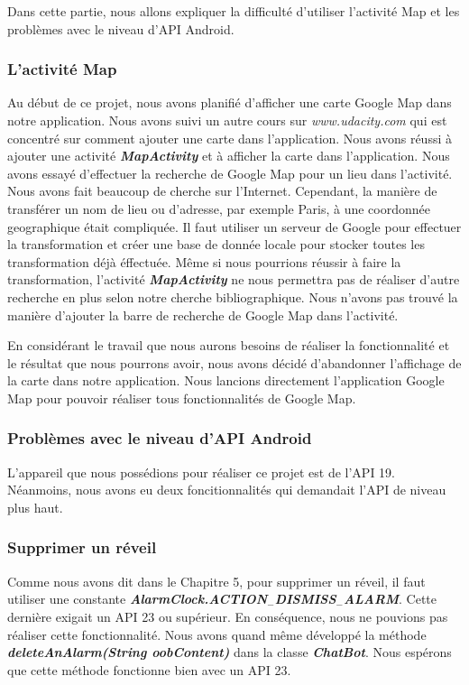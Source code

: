 \indent Dans cette partie, nous allons expliquer la difficulté d'utiliser l'activité Map et les problèmes avec le niveau d'API Android.

\subsubsection{L'activité Map}

\indent Au début de ce projet, nous avons planifié d'afficher une carte Google Map dans notre application. Nous avons suivi un autre cours sur \emph{www.udacity.com} qui est concentré sur comment ajouter une carte dans l'application. Nous avons réussi à ajouter une activité \textbf{\emph{MapActivity}} et à afficher la carte dans l'application. Nous avons essayé d'effectuer la recherche de Google Map pour un lieu dans l'activité. Nous avons fait beaucoup de cherche sur l'Internet. Cependant, la manière de transférer un nom de lieu ou d'adresse, par exemple Paris, à une coordonnée geographique était compliquée. Il faut utiliser un serveur de Google pour effectuer la transformation et créer une base de donnée locale pour stocker toutes les transformation déjà éffectuée. Même si nous pourrions réussir à faire la transformation, l'activité \textbf{\emph{MapActivity}} ne nous permettra pas de réaliser d'autre recherche en plus selon notre cherche bibliographique. Nous n'avons pas trouvé la manière d'ajouter la barre de recherche de Google Map dans l'activité.

\indent En considérant le travail que nous aurons besoins de réaliser la fonctionnalité et le résultat que nous pourrons avoir, nous avons décidé d'abandonner l'affichage de la carte dans notre application. Nous lancions directement l'application Google Map pour pouvoir réaliser tous fonctionnalités de Google Map.

\subsubsection{Problèmes avec le niveau d'API Android}

\indent L'appareil que nous possédions pour réaliser ce projet est de l'API 19. Néanmoins, nous avons eu deux foncitionnalités qui demandait l'API de niveau plus haut.

\subsubsection{Supprimer un réveil}

\indent Comme nous avons dit dans le Chapitre 5, pour supprimer un réveil, il faut utiliser une constante \textbf{\emph{AlarmClock.ACTION$_-$DISMISS$_-$ALARM}}. Cette dernière exigait un API 23 ou supérieur. En conséquence, nous ne pouvions pas réaliser cette fonctionnalité. Nous avons quand même développé la méthode \textbf{\emph{deleteAnAlarm(String oobContent)}} dans la classe \textbf{\emph{ChatBot}}. Nous espérons que cette méthode fonctionne bien avec un API 23.

